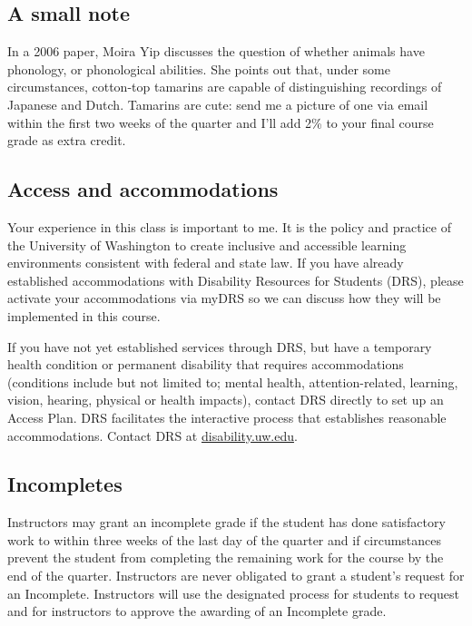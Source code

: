 \documentclass[12pt, letterpaper]{article}
\begin{document}
\subsection*{A small note}	\label{sec:tamarins}

In a 2006 paper, Moira Yip discusses the question of whether animals have phonology, or phonological abilities. She points out that, under some circumstances, cotton-top tamarins are capable of distinguishing recordings of Japanese and Dutch. Tamarins are cute: send me a picture of one via email within the first two weeks of the quarter and I’ll add 2\% to your final course grade as extra credit.

\subsection*{Access and accommodations}	\label{sec:DRC}

Your experience in this class is important to me. It is the policy and practice of the University of Washington to create inclusive and accessible learning environments consistent with federal and state law. If you have already established accommodations with Disability Resources for Students (DRS), please activate your accommodations via myDRS so we can discuss how they will be implemented in this course.

If you have not yet established services through DRS, but have a temporary health condition or permanent disability that requires accommodations (conditions include but not limited to; mental health, attention-related, learning, vision, hearing, physical or health impacts), contact DRS directly to set up an Access Plan. DRS facilitates the interactive process that establishes reasonable accommodations. Contact DRS at \href{disability.uw.edu}{disability.uw.edu}.

\subsection*{Incompletes}	\label{sec:Incomplete}

Instructors may grant an incomplete grade if the student has done satisfactory work to within three weeks of the last day of the quarter and if circumstances prevent the student from completing the remaining work for the course by the end of the quarter. Instructors are never obligated to grant a student’s request for an Incomplete. Instructors will use the designated process for students to request and for instructors to approve the awarding of an Incomplete grade.
\end{document}
